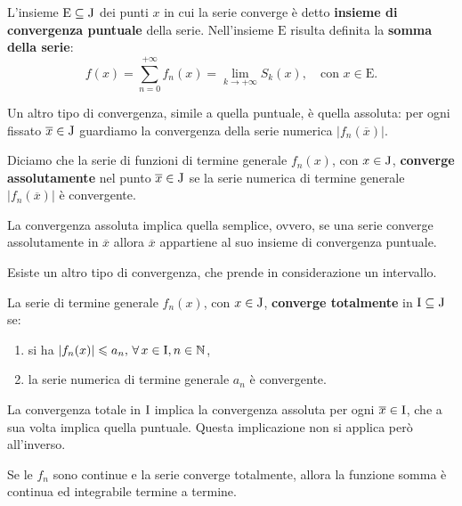 \documentclass[../../analisi2]{subfiles}
\begin{document}
        \begin{definizione}
            L'insieme \(\mathrm{E} \subseteq \mathrm{J}\) dei punti \(x\) in cui la serie converge è detto \textbf{insieme di
            convergenza puntuale} della serie. Nell'insieme \(\mathrm{E}\) risulta definita la \textbf{somma della serie}:
            \[
                f(x) = \sum_{n = 0}^{+\infty} f_n(x) = \lim_{k \to +\infty} S_k (x), \quad \text{con } x \in \mathrm{E}.
            \]
        \end{definizione}

        Un altro tipo di convergenza, simile a quella puntuale, è quella assoluta: per ogni fissato \(\overline{x} \in \mathrm{J}\)
        guardiamo la convergenza della serie numerica \(\left|f_n(\overline{x})\right|\).
        
        \begin{definizione}
            Diciamo che la serie di funzioni di termine generale \(f_n(x)\), con \(x \in \mathrm{J}\), \textbf{converge assolutamente}
            nel punto \(\overline{x} \in \mathrm{J}\) se la serie numerica di termine generale \(\left|f_n(\overline{x})\right|\) è
            convergente.
        \end{definizione}
        \begin{osservazione}
            La convergenza assoluta implica quella semplice, ovvero, se una serie converge assolutamente in \(\overline{x}\) allora
            \(\overline{x}\) appartiene al suo insieme di convergenza puntuale.
        \end{osservazione}

        Esiste un altro tipo di convergenza, che prende in considerazione un intervallo.
        
        \begin{definizione}
            La serie di termine generale \(f_n(x)\), con \(x \in \mathrm{J}\), \textbf{converge totalmente} in
            \(\mathrm{I} \subseteq \mathrm{J}\) se:
            \begin{enumerate}
                \item si ha \(\left|f_n(x)\right| \leqslant a_n, \, \forall \, x \in \mathrm{I}, n \in \mathbb{N}\),
                \item la serie numerica di termine generale \(a_n\) è convergente.
            \end{enumerate}
        \end{definizione}
        \begin{osservazione}
            La convergenza totale in \(\mathrm{I}\) implica la convergenza assoluta per ogni \(\overline{x} \in \mathrm{I}\), che a
            sua volta implica quella puntuale. Questa implicazione non si applica però all'inverso.
        \end{osservazione}
        \begin{osservazione}
            Se le \(f_n\) sono continue e la serie converge totalmente, allora la funzione somma è continua ed integrabile termine
            a termine.
        \end{osservazione}
\end{document}
